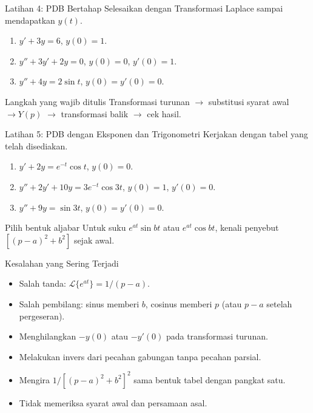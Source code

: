 \documentclass[aspectratio=169,11pt]{beamer}
\newcommand{\Lap}{\mathcal{L}}
\begin{document}
\begin{frame}{Latihan 4: PDB Bertahap}
Selesaikan dengan Transformasi Laplace sampai mendapatkan $y(t)$.
\begin{enumerate}
\item $y'+3y=6$, $y(0)=1$.
\item $y''+3y'+2y=0$, $y(0)=0$, $y'(0)=1$.
\item $y''+4y=2\sin t$, $y(0)=y'(0)=0$.
\end{enumerate}
\begin{alertblock}{Langkah yang wajib ditulis}
Transformasi turunan $\to$ substitusi syarat awal $\to Y(p)$ $\to$ transformasi balik $\to$ cek hasil.
\end{alertblock}
\end{frame}

\begin{frame}{Latihan 5: PDB dengan Eksponen dan Trigonometri}
\small Kerjakan dengan tabel yang telah disediakan.
\begin{enumerate}
\item $y'+2y=e^{-t}\cos t$, $y(0)=0$.
\item $y''+2y'+10y=3e^{-t}\cos3t$, $y(0)=1$, $y'(0)=0$.
\item $y''+9y=\sin3t$, $y(0)=y'(0)=0$.
\end{enumerate}
\vspace{2mm}
\begin{block}{Pilih bentuk aljabar}
Untuk suku $e^{at}\sin bt$ atau $e^{at}\cos bt$, kenali penyebut $[(p-a)^2+b^2]$ sejak awal.
\end{block}
\end{frame}

\begin{frame}{Kesalahan yang Sering Terjadi}
\begin{itemize}
\item Salah tanda: $\Lap\{e^{at}\}=1/(p-a)$.
\item Salah pembilang: sinus memberi $b$, cosinus memberi $p$ (atau $p-a$ setelah pergeseran).
\item Menghilangkan $-y(0)$ atau $-y'(0)$ pada transformasi turunan.
\item Melakukan invers dari pecahan gabungan tanpa pecahan parsial.
\item Mengira $1/[(p-a)^2+b^2]^2$ sama bentuk tabel dengan pangkat satu.
\item Tidak memeriksa syarat awal dan persamaan asal.
\end{itemize}
\end{frame}
\end{document}

